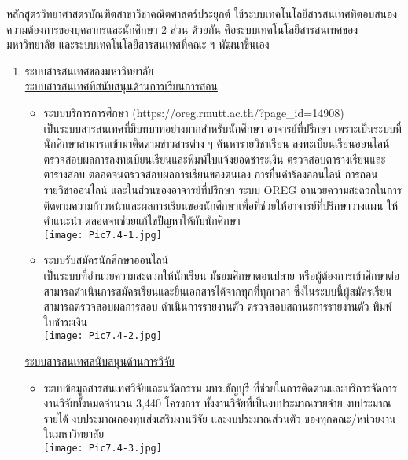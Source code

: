 หลักสูตรวิทยาศาสตรบัณฑิตสาขาวิชาคณิตศาสตร์ประยุกต์ ใช้ระบบเทคโนโลยีสารสนเทศที่ตอบสนองความต้องการของบุคลากรและนักศึกษา 2 ส่วน ด้วยกัน คือระบบเทคโนโลยีสารสนเทศของมหาวิทยาลัย และระบบเทคโนโลยีสารสนเทศที่คณะ ฯ พัฒนาขึ้นเอง
\begin{enumerate}
\item ระบบสารสนเทศของมหาวิทยาลัย\\
\underline{ระบบสารสนเทศที่สนับสนุนด้านการเรียนการสอน}
\begin{itemize} 
\item ระบบบริการการศึกษา (https://oreg.rmutt.ac.th/?page\_id=14908)\\ เป็นระบบสารสนเทศที่มีบทบาทอย่างมากสำหรับนักศึกษา อาจารย์ที่ปรึกษา เพราะเป็นระบบที่นักศึกษาสามารถเข้ามาติดตามข่าวสารต่าง ๆ ค้นหารายวิชาเรียน ลงทะเบียนเรียนออนไลน์ ตรวจสอบผลการลงทะเบียนเรียนและพิมพ์ใบแจ้งยอดชาระเงิน ตรวจสอบตารางเรียนและตารางสอบ ตลอดจนตรวจสอบผลการเรียนของตนเอง การยื่นคำร้องออนไลน์ การถอนรายวิชาออนไลน์ และในส่วนของอาจารย์ที่ปรึกษา ระบบ OREG อานวยความสะดวกในการติดตามความก้าวหน้าและผลการเรียนของนักศึกษาเพื่อที่ช่วยให้อาจารย์ที่ปรึกษาวางแผน ให้คำแนะนำ ตลอดจนช่วยแก้ไขปัญหาให้กับนักศึกษา\\[0.2cm]
\texttt{[image: Pic7.4-1.jpg]}\\[0.2cm]
\item ระบบรับสมัครนักศึกษาออนไลน์ \\เป็นระบบที่อำนวยความสะดวกให้นักเรียน มัธยมศึกษาตอนปลาย หรือผู้ต้องการเข้าศึกษาต่อสามารถดำเนินการสมัครเรียนและยื่นเอกสารได้จากทุกที่ทุกเวลา ซึ่งในระบบนี้ผู้สมัครเรียนสามารถตรวจสอบผลการสอบ ดำเนินการรายงานตัว ตรวจสอบสถานะการรายงานตัว พิมพ์ใบชำระเงิน\\[0.2cm]
\texttt{[image: Pic7.4-2.jpg]}\\[0.2cm]
\end{itemize}
\underline{ระบบสารสนเทศสนับสนุนด้านการวิจัย}
\begin{itemize}
\item ระบบข้อมูลสารสนเทศวิจัยและนวัตกรรม มทร.ธัญบุรี ที่ช่วยในการติดตามและบริการจัดการงานวิจัยทั้งหมดจำนวน  3,440 โครงการ ทั้งงานวิจัยที่เป็นงบประมาณรายจ่าย งบประมาณรายได้ งบประมาณกองทุนส่งเสริมงานวิจัย และงบประมาณส่วนตัว ของทุกคณะ/หน่วยงาน ในมหาวิทยาลัย\\[0.2cm]
\texttt{[image: Pic7.4-3.jpg]}\\[0.2cm]
\end{itemize}

\end{enumerate}
